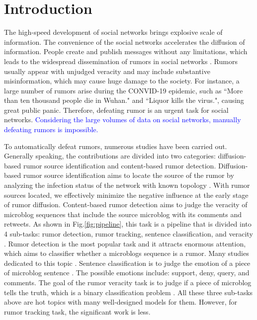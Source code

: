\section{Introduction}
\label{sec:introduction}
The high-speed development of social networks brings explosive scale of information. The convenience of the social networks accelerates the diffusion of information. People create and publish messages without any limitations, which leads to the widespread dissemination of rumors in social networks \cite{DBLP:journals/corr/KurkaGZ15, DBLP:journals/csur/ZubiagaABLP18, DBLP:conf/sirocco/KostkaOW08, vosoughi2018spread}. Rumors usually appear with unjudged veracity and may include substantive misinformation, which may cause huge damage to the society. For instance, a large number of rumors arise during the CONVID-19 epidemic, such as ``More than ten thousand people die in Wuhan." and ``Liquor kills the virus.", causing great public panic. Therefore, defeating rumor is an urgent task for social networks. \textcolor{blue}{Considering the large volumes of data on social networks, manually defeating rumors is impossible. }

To automatically defeat rumors, numerous studies have been carried out. Generally speaking, the contributions are divided into two categories:  diffusion-based rumor source identification and content-based rumor detection. Diffusion-based rumor source identification aims to locate the source of the rumor by analyzing the infection status of the network with known topology \cite{DBLP:conf/sigmetrics/ShahZ10, DBLP:journals/tit/ShahZ11, DBLP:conf/kdd/LappasTGM10}. With rumor sources located, we effectively minimize the negative influence at the early stage of rumor diffusion. Content-based rumor detection aims to judge the veracity of microblog sequences that include the source microblog with its comments and retweets. As shown in Fig.\ref{fig:pipeline}, this task is a pipeline that is divided into 4 sub-tasks: rumor detection, rumor tracking, sentence classification, and veracity \cite{DBLP:journals/csur/ZubiagaABLP18, DBLP:conf/coling/KochkinaLZ18}. Rumor detection is the most popular task and it attracts enormous attention, which aims to classifier whether a microblogs sequence is a rumor. Many studies dedicated to this topic \cite{DBLP:conf/socinfo/ZubiagaLP17, DBLP:conf/www/Ma0W19,DBLP:conf/naacl/NguyenDCD19, DBLP:journals/corr/abs-1906-05659}. Sentence classification is to judge the emotion of a piece of microblog sentence \cite{DBLP:conf/semeval/EnayetE17, DBLP:conf/semeval/X17a, DBLP:conf/coling/ZubiagaKLPL16}. The possible emotions include: support, deny, query, and comments. The goal of the rumor veracity task is to judge if a piece of microblog tells the truth, which is a binary classification problem \cite{DBLP:conf/coling/KochkinaLZ18, DBLP:conf/acl/LiZS19, DBLP:conf/acl/KumarC19}. All these three sub-tasks above are hot topics with many well-designed models for them. However, for rumor tracking task, the significant work is less.

